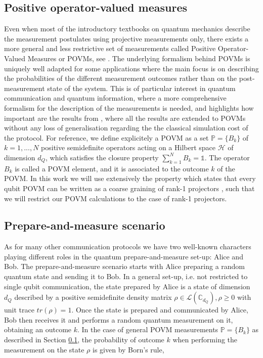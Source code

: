 \subsection{Positive operator-valued measures}\label{section:povms}
Even when most of the introductory textbooks on quantum mechanics describe the measurement postulates using projective measurements only, there exists a more general and less restrictive set of measurements called Positive Operator-Valued Measures or POVMs, see \cite{nielsen2000}\cite{peres1995}. The underlying formalism behind POVMs is uniquely well adapted for some applications where the main focus is on describing the probabilities of the different measurement outcomes rather than on the post-measurement state of the system. This is of particular interest in quantum communication and quantum information, where a more comprehensive formalism for the description of the measurements is needed, and highlights how important are the results from \cite{renner2022}, where all the results are extended to POVMs without any loss of generalisation regarding the the classical simulation cost of the protocol. For reference, we define explicitely a POVM as a set $\mathbb{P}=\{B_{k}\}$ of $k=1,...,N$ positive semidefinite operators acting on a Hilbert space $\mathcal{H}$ of dimension $d_{Q}$, which satisfies the closure property $\sum_{k=1}^{N} B_{k} = \mathbb{1}$. The operator $B_{k}$ is called a POVM element, and it is associated to the outcome $k$ of the POVM. In this work we will use extensively the property which states that every qubit POVM can be written as a coarse graining of rank-1 projectors \cite{barrett2002}, such that we will restrict our POVM calculations to the case of rank-1 projectors.

\subsection{Prepare-and-measure scenario}\label{section:pm}
As for many other communication protocols we have two well-known characters playing different roles in the quantum prepare-and-measure set-up: Alice and Bob. The prepare-and-measure scenario starts with Alice preparing a random quantum state and sending it to Bob. In a general set-up, i.e. not restricted to single qubit communication, the state prepared by Alice is a state of dimension $d_Q$ described by a positive semidefinite density matrix $\rho \in \mathcal{L}( \mathbb{C}_{d_Q}), \rho \ge 0$ with unit trace $tr(\rho)=1$. Once the state is prepared and communicated by Alice, Bob then receives it and performs a random quantum measurement on it, obtaining an outcome $k$. In the case of general POVM measurements $\mathbb P=\{B_{k}\}$ as described in Section \ref{section:povms}, the probability of outcome $k$ when performing the measurement on the state $\rho$ is given by Born's rule,

